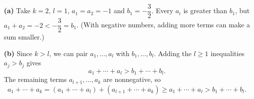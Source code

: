 \textbf{(a)} Take $k=2$, $l=1$, $a_1=a_2=-1$ and $b_1=-\dfrac{3}{2}$. Every $a_i$ is greater than $b_1$, but $a_1+a_2=-2<-\dfrac{3}{2}=b_1$. (With negative numbers, adding more terms can make a sum smaller.)

\textbf{(b)} Since $k>l$, we can pair $a_1,\dots,a_l$ with $b_1,\dots,b_l$. Adding the $l\ge1$ inequalities $a_j>b_j$ gives
\[a_1+\cdots+a_l>b_1+\cdots+b_l .\]
The remaining terms $a_{l+1},\dots,a_k$ are nonnegative, so
\[a_1+\cdots+a_k=\left(a_1+\cdots+a_l\right)+\left(a_{l+1}+\cdots+a_k\right)\ge a_1+\cdots+a_l>b_1+\cdots+b_l .\]
